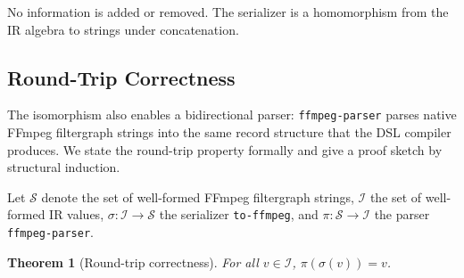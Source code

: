\documentclass[english,submission]{programming}
\newtheorem{theorem}{Theorem}[section]
\begin{document}
No information is added or removed. The serializer is a homomorphism from the IR algebra to strings under concatenation.

\subsection{Round-Trip Correctness}

The isomorphism also enables a bidirectional parser: \texttt{ffmpeg-parser} parses native FFmpeg filtergraph strings into the same record structure that the DSL compiler produces. We state the round-trip property formally and give a proof sketch by structural induction.

Let $\mathcal{S}$ denote the set of well-formed FFmpeg filtergraph strings, $\mathcal{I}$ the set of well-formed IR values, $\sigma : \mathcal{I} \rightarrow \mathcal{S}$ the serializer \texttt{to-ffmpeg}, and $\pi : \mathcal{S} \rightarrow \mathcal{I}$ the parser \texttt{ffmpeg-parser}.

\begin{theorem}[Round-trip correctness]
For all $v \in \mathcal{I}$, $\pi(\sigma(v)) = v$.
\end{theorem}
\end{document}
